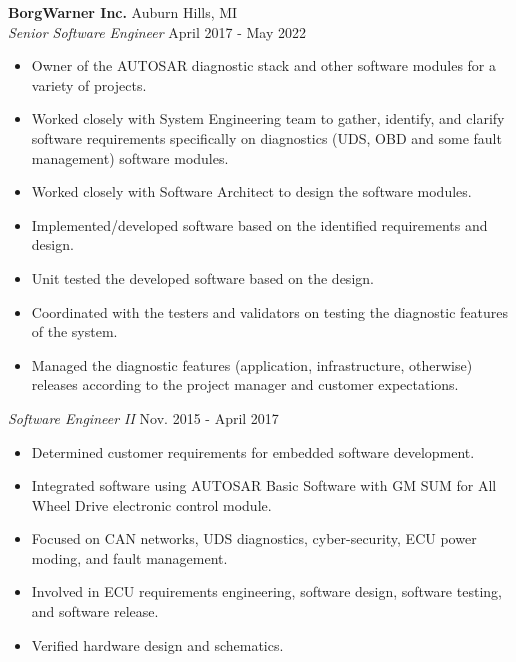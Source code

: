 \vspace{0.75em}

\noindent
\textbf{BorgWarner Inc.} \hfill Auburn Hills, MI \\
\textit{Senior Software Engineer} \hfill April 2017 - May 2022 \\
\begin{itemize}[leftmargin=*,noitemsep,topsep=3pt]
    \item Owner of the AUTOSAR diagnostic stack and other software modules for a variety of projects.
    \item Worked closely with System Engineering team to gather, identify, and clarify software requirements specifically on diagnostics (UDS, OBD and some fault management) software modules.
    \item Worked closely with Software Architect to design the software modules.
    \item Implemented/developed software based on the identified requirements and design.
    \item Unit tested the developed software based on the design.
    \item Coordinated with the testers and validators on testing the diagnostic features of the system.
    \item Managed the diagnostic features (application, infrastructure, otherwise) releases according to the project manager and customer expectations.
\end{itemize}

\vspace{0.5em}

\noindent
\textit{Software Engineer II} \hfill Nov. 2015 - April 2017 \\
\begin{itemize}[leftmargin=*,noitemsep,topsep=3pt]
    \item Determined customer requirements for embedded software development.
    \item Integrated software using AUTOSAR Basic Software with GM SUM for All Wheel Drive electronic control module.
    \item Focused on CAN networks, UDS diagnostics, cyber-security, ECU power moding, and fault management.
    \item Involved in ECU requirements engineering, software design, software testing, and software release.
    \item Verified hardware design and schematics.
\end{itemize}